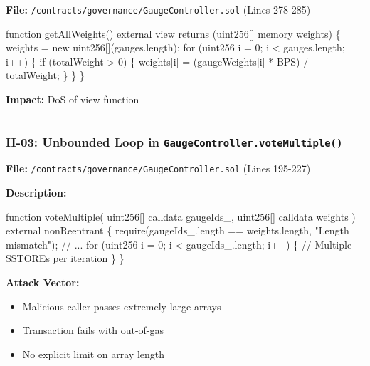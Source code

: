 \documentclass[
]{article}
\newenvironment{Shaded}{}{}
\newcommand{\NormalTok}[1]{#1}
\providecommand{\tightlist}{%
  \setlength{\itemsep}{0pt}\setlength{\parskip}{0pt}}
\begin{document}
\textbf{File:} \texttt{/contracts/governance/GaugeController.sol} (Lines
278-285)

\begin{Shaded}
\begin{Highlighting}[]
\NormalTok{function getAllWeights() external view returns (uint256[] memory weights) \{}
\NormalTok{    weights = new uint256[](gauges.length);}
\NormalTok{    for (uint256 i = 0; i \textless{} gauges.length; i++) \{}
\NormalTok{        if (totalWeight \textgreater{} 0) \{}
\NormalTok{            weights[i] = (gaugeWeights[i] * BPS) / totalWeight;}
\NormalTok{        \}}
\NormalTok{    \}}
\NormalTok{\}}
\end{Highlighting}
\end{Shaded}

\textbf{Impact:} DoS of view function

\begin{center}\rule{0.5\linewidth}{0.5pt}\end{center}

\subsubsection{\texorpdfstring{H-03: Unbounded Loop in
\texttt{GaugeController.voteMultiple()}}{H-03: Unbounded Loop in GaugeController.voteMultiple()}}\label{h-03-unbounded-loop-in-gaugecontrollervotemultiple}

\textbf{File:} \texttt{/contracts/governance/GaugeController.sol} (Lines
195-227)

\textbf{Description:}

\begin{Shaded}
\begin{Highlighting}[]
\NormalTok{function voteMultiple(}
\NormalTok{    uint256[] calldata gaugeIds\_,}
\NormalTok{    uint256[] calldata weights}
\NormalTok{) external nonReentrant \{}
\NormalTok{    require(gaugeIds\_.length == weights.length, "Length mismatch");}
\NormalTok{    // ...}
\NormalTok{    for (uint256 i = 0; i \textless{} gaugeIds\_.length; i++) \{}
\NormalTok{        // Multiple SSTOREs per iteration}
\NormalTok{    \}}
\NormalTok{\}}
\end{Highlighting}
\end{Shaded}

\textbf{Attack Vector:}

\begin{itemize}
\tightlist
\item
  Malicious caller passes extremely large arrays
\item
  Transaction fails with out-of-gas
\item
  No explicit limit on array length
\end{itemize}
\end{document}
